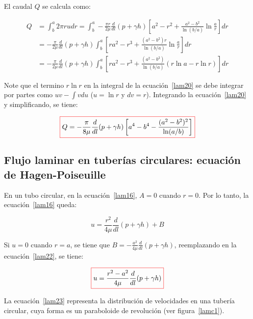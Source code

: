 \documentclass[11pt, oneside]{article}
\begin{document}
El caudal $Q$ se calcula como:

\begin{equation}
\begin{split}
Q & = \int_b^a 2\pi r u dr = \int_b^a -\frac{\pi r}{2\mu}\frac{d}{dl}(p + \gamma h) \left[  a^2 - r^2 + \frac{a^2 - b^2}{\ln(b/a)} \ln \frac{a}{r} \right ] dr \\
& = -\frac{\pi}{2\mu}\frac{d}{dl}(p + \gamma h)\int_b^a \left[ r a^2 - r^3 + \frac{(a^2 - b^2 )r}{\ln(b/a)}\ln \frac{a}{r} \right]dr \\
& = -\frac{\pi}{2\mu}\frac{d}{dl}(p + \gamma h)\int_b^a \left[ r a^2 - r^3 + \frac{(a^2 - b^2 )}{\ln(b/a)}(r\ln a - r \ln r) \right]dr 
\end{split}
\label{lam20}
\end{equation}

Note que el termino $r \ln r$ en la integral de la ecuaci\'on~\ref{lam20} se debe integrar por partes como $uv - \int vdu$ ($u=\ln r$ y $dv=r$). Integrando la ecuaci\'on~\ref{lam20} y simplificando, se tiene:

\begin{equation}
\color{red}\boxed{\color{black} Q = -\frac{\pi}{8\mu}\frac{d}{dl}(p + \gamma h) \left[ a^4 - b^4 - \frac{(a^2 - b^2)^2 }{\ln (a/b)} \right]  }
\label{lam21}
\end{equation}

\subsection{Flujo laminar en tuber\'ias circulares: ecuaci\'on de Hagen-Poiseuille} %
En un tubo circular, en la ecuaci\'on~\ref{lam16},  $A=0$ cuando $r=0$. Por lo tanto, la ecuaci\'on~\ref{lam16} queda:

\begin{equation}
u = \frac{r^2}{4\mu}\frac{d}{dl}(p + \gamma h) + B 
\label{lam22}
\end{equation}

Si $u=0$ cuando $r=a$, se tiene que $B=-\frac{a^2}{4\mu}\frac{d}{dl}(p + \gamma h)$, reemplazando en la ecuaci\'on~\ref{lam22}, se tiene:

\begin{equation}
\color{red}\boxed{\color{black} u = \frac{r^2 - a^2}{4\mu}\frac{d}{dl}(p + \gamma h) }
\label{lam23}
\end{equation}

La ecuaci\'on~\ref{lam23} representa la distribuci\'on de velocidades en una tuber\'ia circular, cuya forma es un paraboloide de revoluci\'on (ver figura~\ref{lamc1}). 
\end{document}

